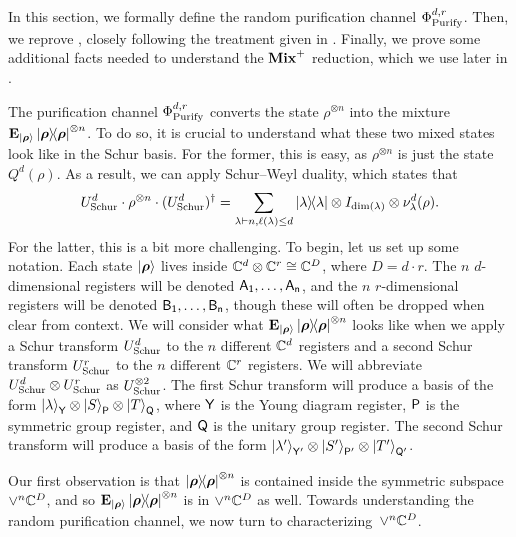 \newcommand{\epr}{\mathrm{EPR}}

In this section, we formally define the random purification channel $\Phi_{\mathrm{Purify}}^{d,r}$.
Then, we reprove , closely following the treatment given in \cite[Section 2.3]{TWZ25}.
Finally, we prove some additional facts needed to understand the $\textup{\textbf{Mix}}^+$ reduction, which we use later in . 

The purification channel $\Phi_{\mathrm{Purify}}^{d,r}$ converts the state $\rho^{\otimes n}$
into the mixture $\mathop{\bf E\/}_{\ket{\boldsymbol{\rho}}} \ketbra{\boldsymbol{\rho}}^{\otimes n}$.
To do so, it is crucial to understand what these two mixed states look like in the Schur basis. For the former, this is easy, as $\rho^{\otimes n}$ is just the state $Q^d(\rho)$. As a result, we can apply Schur--Weyl duality, which states that
\begin{equation}\label{eq:normal-sw-transform}
    U_{\mathrm{Schur}}^d \cdot \rho^{\otimes n} \cdot (U_{\mathrm{Schur}}^d)^{\dagger}
    = \sum_{\lambda \vdash n, \ell(\lambda) \leq d} \ketbra{\lambda} \otimes I_{\dim(\lambda)} \otimes \nu^d_{\lambda}(\rho).
\end{equation}
For the latter, this is a bit more challenging.
To begin, let us set up some notation.
Each state $\ket{\boldsymbol{\rho}}$ lives inside $\mathbb C^d \otimes \mathbb C^r \cong \mathbb C^D$, where $D = d \cdot r$. The $n$ $d$-dimensional registers will be denoted $\mathsf{A_1}, \dots, \mathsf{A_n}$, and the $n$ $r$-dimensional registers will be denoted $\mathsf{B_1}, \dots, \mathsf{B_n}$, though these will often be dropped when clear from context. We will consider what $\mathop{\bf E\/}_{\ket{\boldsymbol{\rho}}} \ketbra{\boldsymbol{\rho}}^{\otimes n}$ looks like when we apply a Schur transform $U_{\mathrm{Schur}}^d$ to the $n$ different $\mathbb C^d$ registers and a second Schur transform $U_{\mathrm{Schur}}^r$ to the $n$ different $\mathbb C^r$ registers. We will abbreviate $U_{\mathrm{Schur}}^d \otimes U_{\mathrm{Schur}}^r$ as $U_{\mathrm{Schur}}^{\otimes 2}$. The first Schur transform will produce a basis of the form $\ket{\lambda}_{\mathsf{Y}} \otimes \ket{S}_{\mathsf{P}} \otimes \ket{T}_{\mathsf{Q}}$, where $\mathsf{Y}$ is the Young diagram register, $\mathsf{P}$ is the symmetric group register, and $\mathsf{Q}$ is the unitary group register.
The second Schur transform will produce a basis of the form $\ket{\lambda'}_{\mathsf{Y}'} \otimes \ket{S'}_{\mathsf{P}'} \otimes \ket{T'}_{\mathsf{Q}'}$.  

Our first observation is that $\ketbra{\boldsymbol{\rho}}^{\otimes n}$ is contained inside the symmetric subspace $\lor^n \mathbb C^D$, and so $\mathop{\bf E\/}_{\ket{\boldsymbol{\rho}}} \ketbra{\boldsymbol{\rho}}^{\otimes n}$ is in $\lor^{n} \mathbb C^D$ as well. Towards understanding the random purification channel, we now turn to characterizing~$\lor^n \mathbb C^D$. 

